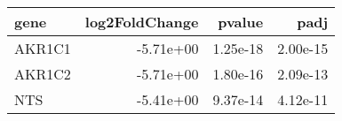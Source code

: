 \begin{tabular}{lrrr}
\toprule
  gene &  log2FoldChange &   pvalue &     padj \\
\midrule
AKR1C1 &       -5.71e+00 & 1.25e-18 & 2.00e-15 \\
AKR1C2 &       -5.71e+00 & 1.80e-16 & 2.09e-13 \\
   NTS &       -5.41e+00 & 9.37e-14 & 4.12e-11 \\
\bottomrule
\end{tabular}
